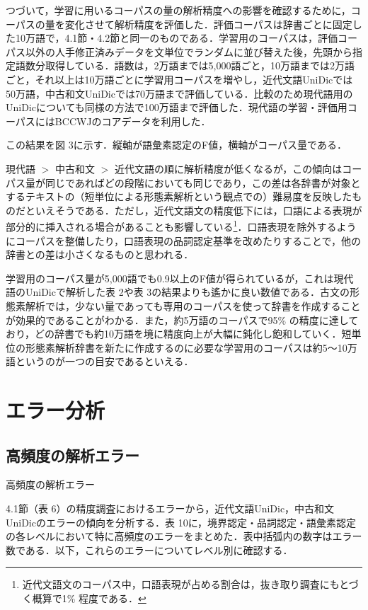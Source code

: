 \documentclass[japanese]{jnlp_1.4}
\begin{document}
つづいて，学習に用いるコーパスの量の解析精度への影響を確認するために，コーパスの量を変化させて解析精度を評価した．評価コーパスは辞書ごとに固定した10万語で，4.1節・4.2節と同一のものである．学習用のコーパスは，評価コーパス以外の人手修正済みデータを文単位でランダムに並び替えた後，先頭から指定語数分取得している．語数は，2万語までは5,000語ごと，10万語までは2万語ごと，それ以上は10万語ごとに学習用コーパスを増やし，近代文語UniDicでは50万語，中古和文UniDicでは70万語まで評価している．比較のため現代語用のUniDicについても同様の方法で100万語まで評価した．現代語の学習・評価用コーパスにはBCCWJのコアデータを利用した．

この結果を図 3に示す．縦軸が語彙素認定のF値，横軸がコーパス量である．

現代語 $>$ 中古和文 $>$ 近代文語の順に解析精度が低くなるが，この傾向はコーパス量が同じであればどの段階においても同じであり，この差は各辞書が対象とするテキストの（短単位による形態素解析という観点での）難易度を反映したものだといえそうである．ただし，近代文語文の精度低下には，口語による表現が部分的に挿入される場合があることも影響している\footnote{近代文語文のコーパス中，口語表現が占める割合は，抜き取り調査にもとづく概算で1\% 程度である．}．口語表現を除外するようにコーパスを整備したり，口語表現の品詞認定基準を改めたりすることで，他の辞書との差は小さくなるものと思われる．

学習用のコーパス量が5,000語でも0.9以上のF値が得られているが，これは現代語のUniDicで解析した表 2や表 3の結果よりも遙かに良い数値である．古文の形態素解析では，少ない量であっても専用のコーパスを使って辞書を作成することが効果的であることがわかる．また，約5万語のコーパスで95\% の精度に達しており，どの辞書でも約10万語を境に精度向上が大幅に鈍化し飽和していく．短単位の形態素解析辞書を新たに作成するのに必要な学習用のコーパスは約5〜10万語というのが一つの目安であるといえる．



\section{エラー分析}

\subsection{高頻度の解析エラー}

\begin{table}[b]
\caption{高頻度の解析エラー}
\label{tab10}

\end{table}

4.1節（表 6）の精度調査におけるエラーから，近代文語UniDic，中古和文UniDicのエラーの傾向を分析する．表 10に，境界認定・品詞認定・語彙素認定の各レベルにおいて特に高頻度のエラーをまとめた．表中括弧内の数字はエラー数である．以下，これらのエラーについてレベル別に確認する．
\end{document}

